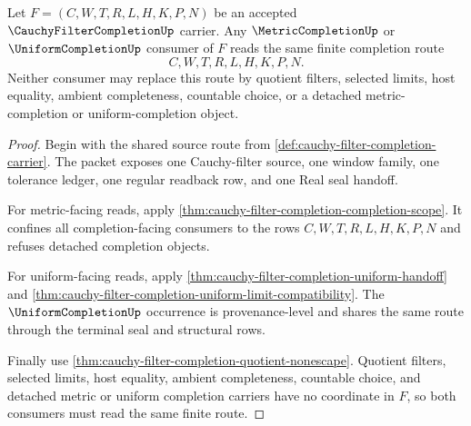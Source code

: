 \begin{theorem}
\label{thm:cauchy-filter-completion-metric-uniform-compatibility}
Let $F=(C,W,T,R,L,H,K,P,N)$ be an accepted $\CauchyFilterCompletionUp$ carrier. Any $\MetricCompletionUp$ or $\UniformCompletionUp$ consumer of $F$ reads the same finite completion route
$$
C,W,T,R,L,H,K,P,N .
$$
Neither consumer may replace this route by quotient filters, selected limits, host equality, ambient completeness, countable choice, or a detached metric-completion or uniform-completion object.
\end{theorem}
\begin{proof}
Begin with the shared source route from \autoref{def:cauchy-filter-completion-carrier}. The packet exposes one Cauchy-filter source, one window family, one tolerance ledger, one regular readback row, and one Real seal handoff.

For metric-facing reads, apply \autoref{thm:cauchy-filter-completion-completion-scope}. It confines all completion-facing consumers to the rows $C,W,T,R,L,H,K,P,N$ and refuses detached completion objects.

For uniform-facing reads, apply \autoref{thm:cauchy-filter-completion-uniform-handoff} and \autoref{thm:cauchy-filter-completion-uniform-limit-compatibility}. The $\UniformCompletionUp$ occurrence is provenance-level and shares the same route through the terminal seal and structural rows.

Finally use \autoref{thm:cauchy-filter-completion-quotient-nonescape}. Quotient filters, selected limits, host equality, ambient completeness, countable choice, and detached metric or uniform completion carriers have no coordinate in $F$, so both consumers must read the same finite route.
\end{proof}

